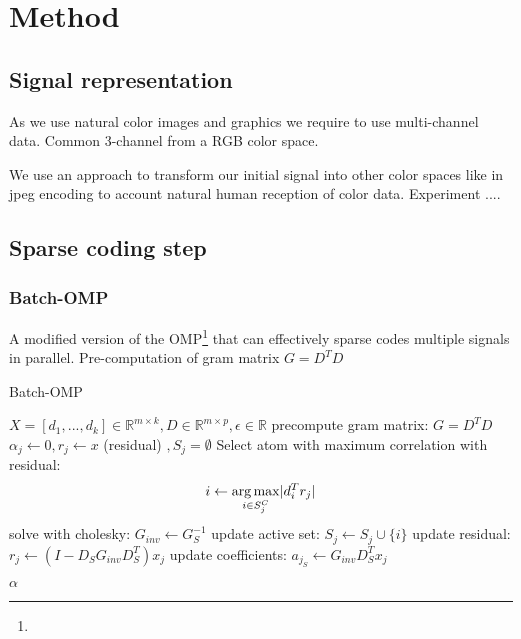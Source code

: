 \chapter{Method}
\thispagestyle{empty}

\section{Signal representation}
As we use natural color images and graphics we require to use multi-channel data. Common 3-channel from a RGB color space.

We use an approach to transform our initial signal into other color spaces like in jpeg encoding to account natural human reception of
color data. 
Experiment ....


\section{Sparse coding step}
\subsection{Batch-OMP}
A modified version of the OMP\footnote{} that can effectively sparse codes multiple signals in parallel.
Pre-computation of gram matrix $G=D^TD$
\cite{Rubinstein2008}

\begin{algorithm}
\caption{Batch-OMP}
\begin{algorithmic}[1]
\REQUIRE $X =[d_1,...,d_k]  \in \mathbb{R}^{m \times k}, D \in \mathbb{R}^{m\times p}, \epsilon \in \mathbb{R}$
\STATE precompute gram matrix: $G=D^TD$
\STATE $\alpha_j \gets 0, r_j \gets x $ (residual) $, S_j=\emptyset$
\STATE Select atom with maximum correlation with residual: 
\begin{equation*}
i \gets \operatorname*{arg\,max}_{i \in S_j^C} \lvert d_i^Tr_j \rvert
\end{equation*}
\STATE solve with cholesky: $G_{inv} \gets G_S^{-1}$
\STATE update active set: $S_j \gets S_j \cup \{i\} $
\STATE update residual: $r_j \gets \left(I-D_SG_{inv}D_S^T \right)x_j$
\STATE update coefficients: $a_{j_S} \gets G_{inv} D_S^T x_j $

\ENDFOR 
\ENDFOR 

\RETURN $\alpha$
\end{algorithmic}
\end{algorithm}

